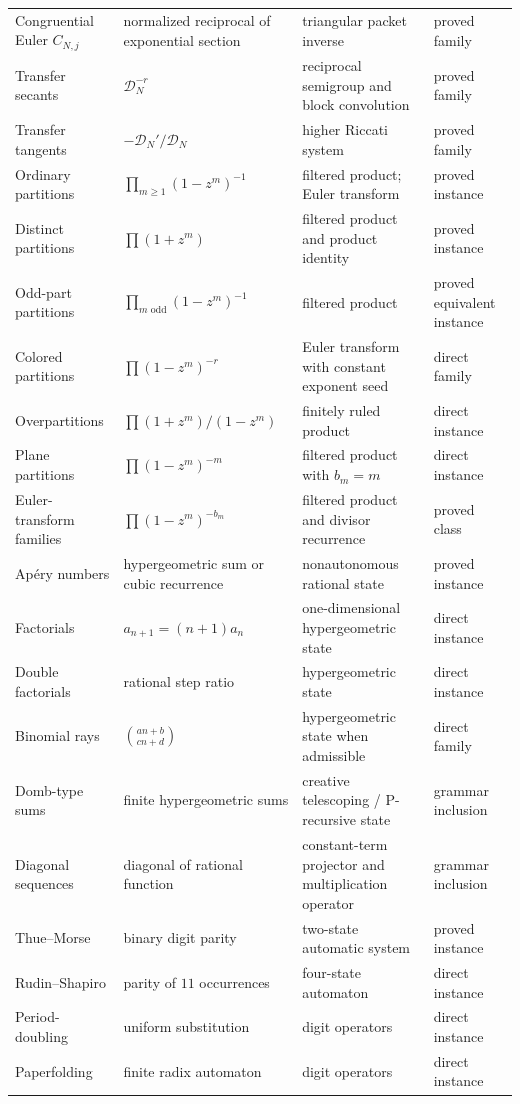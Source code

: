 \documentclass[11pt]{article}
\theoremstyle{definition}\newtheorem{definition}[theorem]{Definition}\newtheorem{example}[theorem]{Example}\newtheorem{construction}[theorem]{Construction}\newtheorem{algorithm}[theorem]{Algorithm}\newtheorem{conjecture}[theorem]{Conjecture}\newtheorem{problem}[theorem]{Problem}
\theoremstyle{remark}\newtheorem{remark}[theorem]{Remark}\newtheorem{boundary}[theorem]{Boundary}\newtheorem{certificate}[theorem]{Computational Certificate}\newtheorem{classical}[theorem]{Classical Input}\newtheorem{principle}[theorem]{Structural Principle}
\begin{document}
\begin{longtable}{L{.15\textwidth}L{.20\textwidth}L{.28\textwidth}L{.18\textwidth}}
Congruential Euler $C_{N,j}$&normalized reciprocal of exponential section&triangular packet inverse&proved family\\
Transfer secants&$\mathcal D_N^{-r}$&reciprocal semigroup and block convolution&proved family\\
Transfer tangents&$-\mathcal D_N'/\mathcal D_N$&higher Riccati system&proved family\\
Ordinary partitions&$\prod_{m\ge1}(1-z^m)^{-1}$&filtered product; Euler transform&proved instance\\
Distinct partitions&$\prod(1+z^m)$&filtered product and product identity&proved instance\\
Odd-part partitions&$\prod_{m\text{ odd}}(1-z^m)^{-1}$&filtered product&proved equivalent instance\\
Colored partitions&$\prod(1-z^m)^{-r}$&Euler transform with constant exponent seed&direct family\\
Overpartitions&$\prod(1+z^m)/(1-z^m)$&finitely ruled product&direct instance\\
Plane partitions&$\prod(1-z^m)^{-m}$&filtered product with $b_m=m$&direct instance\\
Euler-transform families&$\prod(1-z^m)^{-b_m}$&filtered product and divisor recurrence&proved class\\
Ap\'ery numbers&hypergeometric sum or cubic recurrence&nonautonomous rational state&proved instance\\
Factorials&$a_{n+1}=(n+1)a_n$&one-dimensional hypergeometric state&direct instance\\
Double factorials&rational step ratio&hypergeometric state&direct instance\\
Binomial rays&$\binom{an+b}{cn+d}$&hypergeometric state when admissible&direct family\\
Domb-type sums&finite hypergeometric sums&creative telescoping / P-recursive state&grammar inclusion\\
Diagonal sequences&diagonal of rational function&constant-term projector and multiplication operator&grammar inclusion\\
Thue--Morse&binary digit parity&two-state automatic system&proved instance\\
Rudin--Shapiro&parity of $11$ occurrences&four-state automaton&direct instance\\
Period-doubling&uniform substitution&digit operators&direct instance\\
Paperfolding&finite radix automaton&digit operators&direct instance\\

\end{longtable}
\end{document}
